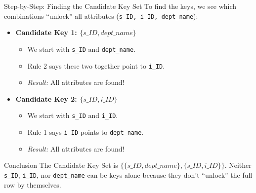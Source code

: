 \documentclass[aspectratio=169]{beamer}
\begin{document}
\begin{frame}{Step-by-Step: Finding the Candidate Key Set}
    To find the keys, we see which combinations ``unlock'' all attributes (\texttt{s\_ID, i\_ID, dept\_name}):

    \begin{itemize}
        \item \textbf{Candidate Key 1: $\{s\_ID, dept\_name\}$}
            \begin{itemize}
                \item We start with \texttt{s\_ID} and \texttt{dept\_name}.
                \item Rule 2 says these two together point to \texttt{i\_ID}.
                \item \textit{Result:} All attributes are found!
            \end{itemize}

        \item \textbf{Candidate Key 2: $\{s\_ID, i\_ID\}$}
            \begin{itemize}
                \item We start with \texttt{s\_ID} and \texttt{i\_ID}.
                \item Rule 1 says \texttt{i\_ID} points to \texttt{dept\_name}.
                \item \textit{Result:} All attributes are found!
            \end{itemize}
    \end{itemize}

    \begin{exampleblock}{Conclusion}
        The Candidate Key Set is $\{\{s\_ID, dept\_name\}, \{s\_ID, i\_ID\}\}$. Neither \texttt{s\_ID}, \texttt{i\_ID}, nor \texttt{dept\_name} can be keys alone because they don't ``unlock'' the full row by themselves.
    \end{exampleblock}
\end{frame}
\end{document}
